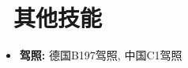 \documentclass{resume}
\begin{document}
\section{\faWrench\ 其他技能}
\begin{itemize}
  \item \textbf{驾照:} 德国B197驾照, 中国C1驾照 
\end{itemize}
\end{document}
